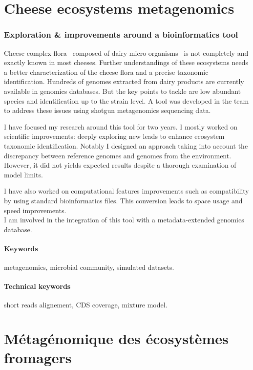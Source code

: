 \section*{Cheese ecosystems
metagenomics}\label{cheese-ecosystems-metagenomics}
\vspace{-2em}
\subsubsection*{Exploration \& improvements around a bioinformatics
tool}\label{exploration-improvements-around-a-bioinformatics-tool}

Cheese complex flora --composed of dairy micro-organisms-- is not
completely and exactly known in most cheeses. Further understandings of
these ecosystems needs a better characterization of the cheese flora and
a precise taxonomic identification. Hundreds of genomes extracted from
dairy products are currently available in genomics databases. But the
key points to tackle are low abundant species and identification up to
the strain level. A tool was developed in the team to address these
issues using shotgun metagenomics sequencing data.

I have focused my research around this tool for two years. I mostly
worked on scientific improvements: deeply exploring new leads to enhance
ecosystem taxonomic identification. Notably I designed an approach
taking into account the discrepancy between reference genomes and
genomes from the environment. However, it did not yields expected
results despite a thorough examination of model limits.

I have also worked on computational features improvements such as
compatibility by using standard bioinformatics files. This conversion
leads to space usage and speed improvements.\\
I am involved in the integration of this tool with a metadata-extended
genomics database.

\paragraph{Keywords} metagenomics, microbial community, simulated datasets.
\vspace{-2em}
\paragraph{Technical keywords} short reads alignement, CDS coverage,
mixture model.

\section*{Métagénomique des écosystèmes
fromagers}\label{muxe9taguxe9nomique-des-uxe9cosystuxe8mes-fromagers}
\vspace{-2em}
